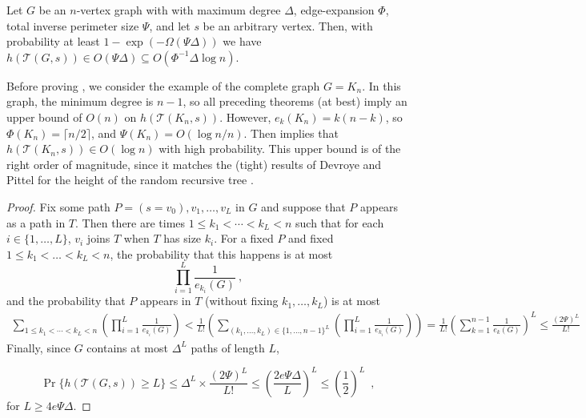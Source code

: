 \documentclass{patmorin}
\newcommand{\tcal}{\mathcal{T}}
\begin{document}

\begin{thm}
  Let $G$ be an $n$-vertex graph with with maximum degree $\Delta$,
  edge-expansion $\Phi$, total inverse perimeter size $\Psi$,
  and let $s$ be an arbitrary vertex.
  Then, with probability at least $1-\exp(-\Omega(\Psi\Delta))$ we have
  $h(\tcal(G,s)) \in O(\Psi\Delta)\subseteq O(\Phi^{-1}\Delta\log n)$.
\end{thm}

Before proving , we
consider the example of the complete graph $G=K_n$.  In this graph,
the minimum degree is $n-1$, so all preceding theorems (at best)
imply an upper bound of $O(n)$ on $h(\tcal(K_n,s))$.  However, $e_k(K_n) = k(n-k)$,
so $\Phi(K_n) = \lceil n/2\rceil$, and $\Psi(K_n) = O(\log n/n)$.
Then  implies that $h(\tcal(K_n,s))\in
O(\log n)$ with high probability. This upper bound
is of the right order of magnitude, since it matches the (tight) results
of Devroye and Pittel for the height of the random recursive tree
\cite{devroye:branching,pittel:note}.


\begin{proof}
   Fix some path $P=(s=v_0),v_1,\ldots,v_L$ in $G$ and suppose that $P$
   appears as a path in $T$.  Then there are times $1\leq k_1<\cdots<k_L<n$
   such that for each $i\in\{1,\ldots,L\}$, $v_i$ joins $T$ when
   $T$ has size $k_i$.  For a fixed $P$ and fixed $1\le k_1<\ldots<k_L<n$,
   the probability that this happens is at most
   \[
       \prod_{i=1}^{L} \frac{1}{e_{k_i}(G)} \:,
   \]  
   and the probability that $P$ appears in $T$ (without fixing
   $k_1,\ldots,k_L$) is at most
   \begin{align*}
       \sum_{1\le k_1<\cdots<k_L< n}
        \left(
         \prod_{i=1}^{L} \frac{1}{e_{k_i}(G)}
        \right) 
       < 
       \frac{1}{L!}\left(\sum_{(k_1,\ldots,k_L)\in\{1,\ldots,n-1\}^L}
        \left(
         \prod_{i=1}^{L} \frac{1}{e_{k_i}(G)}
        \right)\right)  
       = \frac{1}{L!}\left(\sum_{k=1}^{n-1}\frac{1}{e_k(G)}\right)^L 
       \le \frac{(2\Psi)^L}{L!} 
   \end{align*}
   Finally, since $G$ contains at most $\Delta^L$ paths of length $L$,
   
   \[
        \Pr\{h(\tcal(G,s)) \ge L\} \le \Delta^L \times \frac{(2\Psi)^L}{L!}  \leq \left(\frac{2e\Psi\Delta}{L}\right)^L
         \le \left(\frac{1}{2}\right)^L \enspace ,
   \]
   for $L\ge 4e\Psi\Delta$.
\end{proof}
\end{document}
